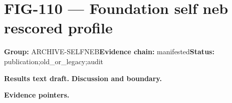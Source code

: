 \clearpage
\section{FIG-110 --- Foundation self neb rescored profile}
\label{figpage:fig-110}
\textbf{Group:} ARCHIVE-SELFNEB\quad \textbf{Evidence chain:} manifested\quad \textbf{Status:} publication;old\_or\_legacy;audit

\textbf{Results text draft.} 
\textbf{Discussion and boundary.} 


\textbf{Evidence pointers.}



\vfill
